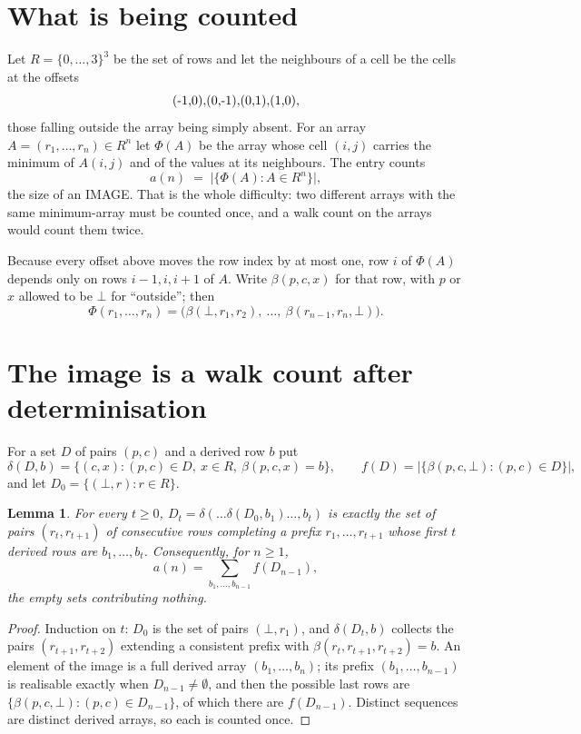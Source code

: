 \documentclass[11pt,a4paper]{article}
\theoremstyle{plain}
\newtheorem{lemma}[theorem]{Lemma}
\theoremstyle{definition}
\begin{document}
\section{What is being counted}

Let $R=\{0,\dots,3\}^{3}$ be the set of rows and let the neighbours of
a cell be the cells at the offsets
\[
$(-1,0)$, $(0,-1)$, $(0,1)$, $(1,0)$,
\]
those falling outside the array being simply absent. For an array
$A=(r_1,\dots,r_n)\in R^n$ let $\Phi(A)$ be the array whose cell $(i,j)$ carries the
minimum of $A(i,j)$ and of the values at its neighbours. The entry counts
\[
a(n)\;=\;\bigl|\{\Phi(A):A\in R^n\}\bigr| ,
\]
the size of an IMAGE. That is the whole difficulty: two different arrays with the same
minimum-array must be counted once, and a walk count on the arrays would count them twice.

Because every offset above moves the row index by at most one, row $i$ of
$\Phi(A)$ depends only on rows $i-1,i,i+1$ of $A$. Write $\beta(p,c,x)$ for that row, with $p$
or $x$ allowed to be $\bot$ for ``outside''; then
\[
\Phi(r_1,\dots,r_n)=\bigl(\beta(\bot,r_1,r_2),\ \dots,\ \beta(r_{n-1},r_n,\bot)\bigr).
\]

\section{The image is a walk count after determinisation}

For a set $D$ of pairs $(p,c)$ and a derived row $b$ put
\[
\delta(D,b)=\{(c,x):(p,c)\in D,\ x\in R,\ \beta(p,c,x)=b\},\qquad
f(D)=\bigl|\{\beta(p,c,\bot):(p,c)\in D\}\bigr| ,
\]
and let $D_0=\{(\bot,r):r\in R\}$.

\begin{lemma}\label{lem:det}
For every $t\ge0$, $D_t=\delta(\dots\delta(D_0,b_1)\dots,b_t)$ is exactly the set of pairs
$(r_t,r_{t+1})$ of consecutive rows completing a prefix $r_1,\dots,r_{t+1}$ whose first $t$
derived rows are $b_1,\dots,b_t$. Consequently, for $n\ge1$,
\[
a(n)=\sum_{b_1,\dots,b_{n-1}}f(D_{n-1}),
\]
the empty sets contributing nothing.
\end{lemma}

\begin{proof}
Induction on $t$: $D_0$ is the set of pairs $(\bot,r_1)$, and $\delta(D_t,b)$ collects the
pairs $(r_{t+1},r_{t+2})$ extending a consistent prefix with
$\beta(r_t,r_{t+1},r_{t+2})=b$. An element of the image is a full derived array
$(b_1,\dots,b_n)$; its prefix $(b_1,\dots,b_{n-1})$ is realisable exactly when
$D_{n-1}\neq\emptyset$, and then the possible last rows are
$\{\beta(p,c,\bot):(p,c)\in D_{n-1}\}$, of which there are $f(D_{n-1})$. Distinct sequences
are distinct derived arrays, so each is counted once.
\end{proof}
\end{document}
